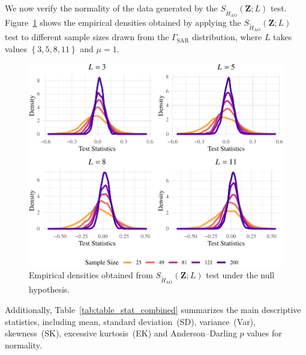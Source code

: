 We now verify the normality of the data generated by the
\(S_{\widetilde{H}_{\text{AO}}}(\bm{Z}; L)\) test.
Figure~\ref{fig:Plot_density} shows the empirical densities obtained by
applying the \(S_{\widetilde{H}_{\text{AO}}}(\bm{Z}; L)\) test to
different sample sizes drawn from the \(\Gamma_{\text{SAR}}\)
distribution, where \(L\) takes values \(\left\{3,5, 8,11\right\}\) and
\(\mu=1\). 
\begin{figure}[htb]

{\centering \includegraphics[width=0.8\linewidth]{../../Figures/PDF/Plot_density-1} 

}

\caption{Empirical densities obtained from $S_{\widetilde{H}_{\text{AO}}}(\bm{Z}; L)$ test under the null hypothesis.}\label{fig:Plot_density}
\end{figure}

Additionally, Table~\ref{tab:table_stat_combined} summarizes
the main descriptive statistics, including mean, standard
deviation~(SD), variance~(Var), skewness~(SK), excessive kurtosis~(EK)
and Anderson--Darling \(p\) values for normality. 


